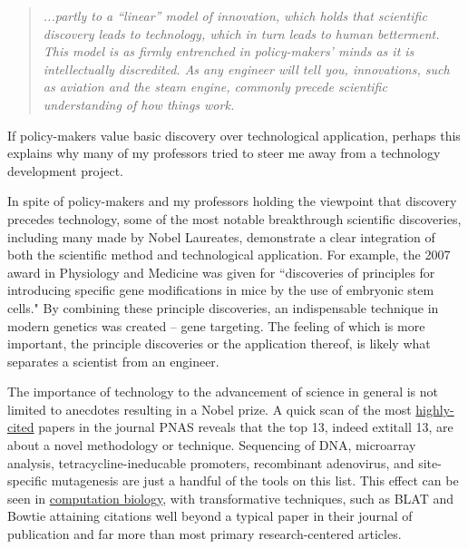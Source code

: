 {{    \begin{quote} 
      \itshape 
      \singlespacing
      ...partly to a ``linear'' model of innovation, which holds that scientific discovery leads to technology, which in turn leads to human betterment.  This model is as firmly entrenched in policy-makers' minds as it is intellectually discredited.  As any engineer will tell you, innovations, such as aviation and the steam engine, commonly precede scientific understanding of how things work.
      \end{quote} 

    If policy-makers value basic discovery over technological application, perhaps this explains why many of my professors tried to steer me away from a technology development project.

    In spite of policy-makers and my professors holding the viewpoint that discovery precedes technology, some of the most notable breakthrough scientific discoveries, including many made by Nobel Laureates, demonstrate a clear integration of both the scientific method and technological application.  For example, the 2007 award in Physiology and Medicine was given for “discoveries of principles for introducing specific gene modifications in mice by the use of embryonic stem cells."  By combining these principle discoveries, an indispensable technique in modern genetics was created – gene targeting.  The feeling of which is more important, the principle discoveries or the application thereof, is likely what separates a scientist from an engineer. 

    The importance of technology to the advancement of science in general is not limited to anecdotes resulting in a Nobel prize. A quick scan of the most \href{http://www.pnas.org/reports/most-cited}{highly-cited} papers in the journal PNAS reveals that the top 13, indeed   extit{all} 13, are about a novel methodology or technique. Sequencing of DNA, microarray analysis, tetracycline-ineducable promoters, recombinant adenovirus, and site-specific mutagenesis are just a handful of the tools on this list. This effect can be seen in \href{http://simplystatistics.org/2014/04/07/writing-good-software-can-have-more-impact-than-publishing-in-high-impact-journals-for-genomic-statisticians/}{computation biology}, with transformative techniques, such as BLAT \citep{Altschul1990} and Bowtie \citep{Langmead2009} attaining citations well beyond a typical paper in their journal of publication and far more than most primary research-centered articles.

}}
